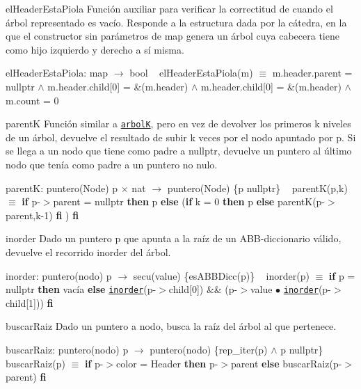 \begin{DoxyParagraph}{el\+Header\+Esta\+Piola}
Función auxiliar para verificar la correctitud de  cuando el árbol representado es vacío. Responde a la estructura dada por la cátedra, en la que el constructor sin parámetros de map genera un árbol cuya cabecera tiene como hijo izquierdo y derecho a sí misma.

el\+Header\+Esta\+Piola\+: map $\to$ bool ~\newline
 el\+Header\+Esta\+Piola(m) $\equiv$ m.\+header.\+parent = nullptr $\land$ m.\+header.\+child\mbox{[}0\mbox{]} = \&(m.\+header) $\land$ m.\+header.\+child\mbox{[}0\mbox{]} = \&(m.\+header) $\land$ m.\+count = 0


\end{DoxyParagraph}
\begin{DoxyParagraph}{parentK}
Función similar a \href{axiomas.html#arbolK}{\tt arbolK}, pero en vez de devolver los primeros k niveles de un árbol, devuelve el resultado de subir k veces por el nodo apuntado por p. Si se llega a un nodo que tiene como padre a nullptr, devuelve un puntero al último nodo que tenía como padre a un puntero no nulo.

parentK\+: puntero(\+Node) p $\times$ nat $\to$ puntero(\+Node) \{p  nullptr\} ~\newline
 parent\+K(p,k) $\equiv$ {\bfseries if} p-\/$>$parent = nullptr {\bfseries then} p {\bfseries else} ({\bfseries if} k = 0 {\bfseries then} p {\bfseries else} parentK(p-\/$>$parent,k-\/1) {\bfseries fi} ) {\bfseries fi} 


\end{DoxyParagraph}
\begin{DoxyParagraph}{inorder}
Dado un puntero p que apunta a la raíz de un A\+B\+B-\/diccionario válido, devuelve el recorrido inorder del árbol.

inorder\+: puntero(nodo) p $\to$ secu(value) \{es\+A\+B\+B\+Dicc(p)\} ~\newline
 inorder(p) $\equiv$ {\bfseries if} p = nullptr {\bfseries then} vacía {\bfseries else} \href{axiomas.html#inorder}{\tt inorder}(p-\/$>$child\mbox{[}0\mbox{]}) \&\& (p-\/$>$value $\bullet$ \href{axiomas.html#inorder}{\tt inorder}(p-\/$>$child\mbox{[}1\mbox{]})) {\bfseries fi} 


\end{DoxyParagraph}
\begin{DoxyParagraph}{buscar\+Raiz}
Dado un puntero a nodo, busca la raíz del árbol al que pertenece.

buscar\+Raiz\+: puntero(nodo) p $\to$ puntero(nodo) \{rep\+\_\+iter(p) $\land$ p  nullptr\} ~\newline
 buscar\+Raiz(p) $\equiv$ {\bfseries if} p-\/$>$color = Header {\bfseries then} p-\/$>$parent {\bfseries else} buscar\+Raiz(p-\/$>$parent) {\bfseries fi} 


\end{DoxyParagraph}
